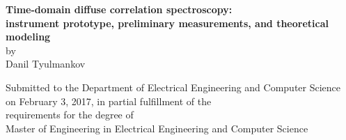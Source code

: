 \cleardoublepage
\begin{center}
{\large{\bf Time-domain diffuse correlation spectroscopy:\\ instrument prototype, preliminary measurements, and theoretical modeling} \\
by \\
Danil Tyulmankov\\[\baselineskip]}
\par
\def\baselinestretch{1}\normalsize
Submitted to the Department of Electrical Engineering and Computer Science \\
on February 3, 2017, in partial fulfillment of the \\
requirements for the degree of \\
Master of Engineering in Electrical Engineering and Computer Science
\end{center}
\par
